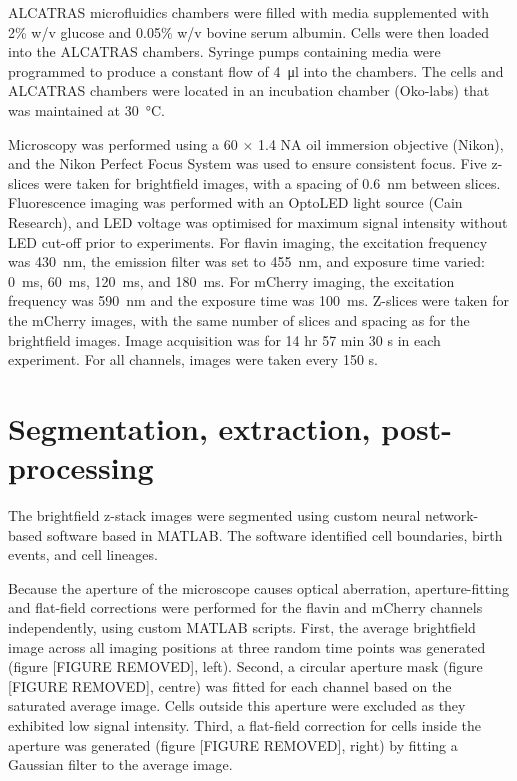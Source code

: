 ALCATRAS microfluidics \parencite{craneMicrofluidicSystemStudying2014}  chambers were filled with media supplemented with 2\% w/v glucose and 0.05\% w/v bovine serum albumin.
Cells were then loaded into the ALCATRAS chambers.
Syringe pumps containing media were programmed to produce a constant flow of \SI{4}{\micro\litre} into the chambers.
The cells and ALCATRAS chambers were located in an incubation chamber (Oko-labs) that was maintained at \SI{30}{\celsius}.

Microscopy was performed using a 60 $\times$ 1.4 NA oil immersion objective (Nikon), and the Nikon Perfect Focus System was used to ensure consistent focus.
Five z-slices were taken for brightfield images, with a spacing of \SI{0.6}{\nano\metre} between slices.
Fluorescence imaging was performed with an OptoLED light source (Cain Research), and LED voltage was optimised for maximum signal intensity without LED cut-off prior to experiments.
For flavin imaging, the excitation frequency was \SI{430}{\nano\metre}, the emission filter was set to \SI{455}{\nano\metre}, and exposure time varied: \SI{0}{\milli\second}, \SI{60}{\milli\second}, \SI{120}{\milli\second}, and \SI{180}{\milli\second}.
For mCherry imaging, the excitation frequency was \SI{590}{\nano\metre} and the exposure time was \SI{100}{\milli\second}.
Z-slices were taken for the mCherry images, with the same number of slices and spacing as for the brightfield images.
Image acquisition was for 14 hr 57 min 30 s in each experiment.
For all channels, images were taken every 150 s.

\section{Segmentation, extraction, post-processing}
\label{sec:methods-segmentation}


The brightfield z-stack images were segmented using custom neural network-based software based in MATLAB.
The software identified cell boundaries, birth events, and cell lineages.

Because the aperture of the microscope causes optical aberration, aperture-fitting and flat-field corrections were performed for the flavin and mCherry channels independently, using custom MATLAB scripts.
First, the average brightfield image across all imaging positions at three random time points was generated (figure [FIGURE REMOVED], left).
Second, a circular aperture mask (figure [FIGURE REMOVED], centre) was fitted for each channel based on the saturated average image.
Cells outside this aperture were excluded as they exhibited low signal intensity.
Third, a flat-field correction for cells inside the aperture was generated (figure [FIGURE REMOVED], right) by fitting a Gaussian filter to the average image.

